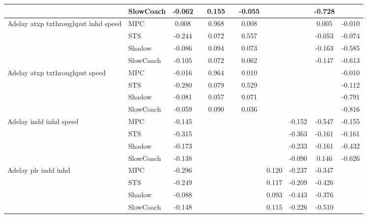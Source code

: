 \begin{tabular}{|l|l|*{9}{c|}}
                              & SlowCoach &   -0.062 &        &     0.155 &     & -0.055 &     &      &  -0.728 &       \\
\midrule
Adelay atxp txthroughput inhd speed    & MPC &    0.008 &        &     0.968 &     &  0.008 &     &      &   0.005 &   -0.010 \\
                              & STS &   -0.244 &        &     0.072 &     &  0.557 &     &      &  -0.053 &   -0.074 \\
                              & Shadow &   -0.086 &        &     0.094 &     &  0.073 &     &      &  -0.163 &   -0.585 \\
                              & SlowCoach &   -0.105 &        &     0.072 &     &  0.062 &     &      &  -0.147 &   -0.613 \\
\midrule
Adelay atxp txthroughput speed    & MPC &   -0.016 &        &     0.964 &     &  0.010 &     &      &      &   -0.010 \\
                              & STS &   -0.280 &        &     0.079 &     &  0.529 &     &      &      &   -0.112 \\
                              & Shadow &   -0.081 &        &     0.057 &     &  0.071 &     &      &      &   -0.791 \\
                              & SlowCoach &   -0.059 &        &     0.090 &     &  0.036 &     &      &      &   -0.816 \\
\midrule
Adelay indd inhd speed    & MPC &   -0.145 &        &        &     &     &     &  -0.152 &  -0.547 &   -0.155 \\
                              & STS &   -0.315 &        &        &     &     &     &  -0.363 &  -0.161 &   -0.161 \\
                              & Shadow &   -0.173 &        &        &     &     &     &  -0.233 &  -0.161 &   -0.432 \\
                              & SlowCoach &   -0.138 &        &        &     &     &     &  -0.090 &   0.146 &   -0.626 \\
\midrule
Adelay plr indd inhd    & MPC &   -0.296 &        &        &     &     &  0.120 &  -0.237 &  -0.347 &       \\
                              & STS &   -0.249 &        &        &     &     &  0.117 &  -0.209 &  -0.426 &       \\
                              & Shadow &   -0.088 &        &        &     &     &  0.093 &  -0.443 &  -0.376 &       \\
                              & SlowCoach &   -0.148 &        &        &     &     &  0.115 &  -0.226 &  -0.510 &       \\

\end{tabular}
